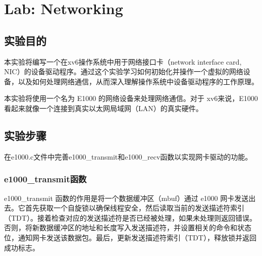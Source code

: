 \section{Lab: Networking}

\subsection{实验目的}

本实验将编写一个在xv6操作系统中用于网络接口卡（network interface card, NIC）的设备驱动程序。通过这个实验学习如何初始化并操作一个虚拟的网络设备，以及如何处理网络通信，从而深入理解操作系统中设备驱动程序的工作原理。

本实验将使用一个名为 E1000 的网络设备来处理网络通信。对于 xv6来说，E1000 看起来就像一个连接到真实以太网局域网（LAN）的真实硬件。

\subsection{实验步骤}

在e1000.c文件中完善e1000\_transmit和e1000\_recv函数以实现网卡驱动的功能。

\subsubsection*{e1000\_transmit函数}
e1000\_transmit 函数的作用是将一个数据缓冲区（mbuf）通过 e1000 网卡发送出去。它首先获取一个自旋锁以确保线程安全，然后读取当前的发送描述符索引（TDT）。接着检查对应的发送描述符是否已经被处理，如果未处理则返回错误。否则，将新数据缓冲区的地址和长度写入发送描述符，并设置相关的命令和状态位，通知网卡发送该数据包。最后，更新发送描述符索引（TDT），释放锁并返回成功标志。


